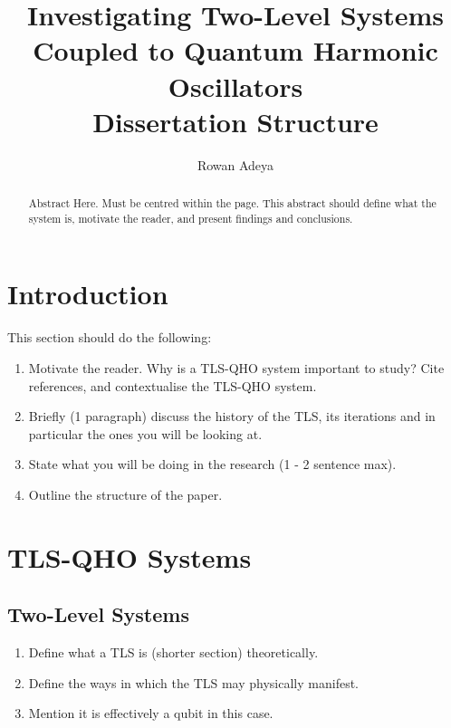 \documentclass{article}
\title{\textbf{Investigating Two-Level Systems Coupled to Quantum Harmonic Oscillators} \\ Dissertation Structure}
\author{Rowan Adeya}
\date{}
\begin{document}
\maketitle

\newpage

\vspace{\fill}
\begin{abstract}
    Abstract Here. Must be centred within the page. This abstract should define what the system is, motivate the reader, and present findings and conclusions.
\end{abstract}
\vspace{\fill}

\newpage

\tableofcontents

\newpage
\section{Introduction}
This section should do the following:
\begin{enumerate}
    \item Motivate the reader. Why is a TLS-QHO system important to study? Cite references, and contextualise the TLS-QHO system. 
    \item Briefly (1 paragraph) discuss the history of the TLS, its iterations and in particular the ones you will be looking at. 
    \item State what you will be doing in the research (1 - 2 sentence max).
    \item Outline the structure of the paper. 
\end{enumerate}
\newpage
\section{TLS-QHO Systems}
\subsection{Two-Level Systems}
\begin{enumerate}
    \item Define what a TLS is (shorter section) theoretically.
    \item Define the ways in which the TLS may physically manifest.
    \item Mention it is effectively a qubit in this case. 
\end{enumerate}
\end{document}
